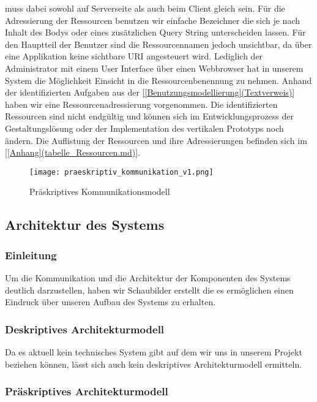 muss dabei sowohl auf Serverseite als auch beim Client gleich sein.
Für die Adressierung der Ressourcen benutzen wir einfache Bezeichner die sich
je nach Inhalt des Bodys oder eines zusätzlichen Query String unterscheiden
lassen. Für den Hauptteil der Benutzer sind die Ressourcennamen jedoch
unsichtbar, da über eine Applikation keine sichtbare URI angesteuert wird.
Lediglich der Administrator mit einem User Interface über einen Webbrowser hat
in unserem System die Möglichkeit Einsicht in die Ressourcenbenennung zu nehmen.
Anhand der identifizierten Aufgaben aus der \ref{[Benutzungsmodellierung](Textverweis)}
haben wir eine Ressourcenadressierung vorgenommen. Die identifizierten
Ressourcen sind nicht endgültig und können sich im Entwicklungsprozess der
Gestaltungslösung oder der Implementation des vertikalen Prototyps noch ändern.
Die Auflistung der Ressourcen und ihre Adressierungen befinden sich im \ref{[Anhang](tabelle_Ressourcen.md)}.

\begin{figure}[h]
	\centering
	\texttt{[image: praeskriptiv\_kommunikation\_v1.png]}
	\caption{Präskriptives Kommunikationsmodell}
\end{figure}


\subsection{Architektur des Systems}
\label{sec:Architektur_des_Systems}

\subsubsection{Einleitung}
\label{sec:Architektur_des_Systems_Einleitung}
Um die Kommunikation und die Architektur der Komponenten des Systems deutlich
darzustellen, haben wir Schaubilder erstellt die es ermöglichen einen Eindruck
über unseren Aufbau des Systems zu erhalten.

\subsubsection{Deskriptives Architekturmodell}
\label{sec:Deskriptives_Architekturmodell}

Da es aktuell kein technisches System gibt auf dem wir uns in unserem Projekt
beziehen können, lässt sich auch kein deskriptives Architekturmodell ermitteln.

\subsubsection{Präskriptives Architekturmodell}
\label{sec:Präskriptives_Architekturmodell}

